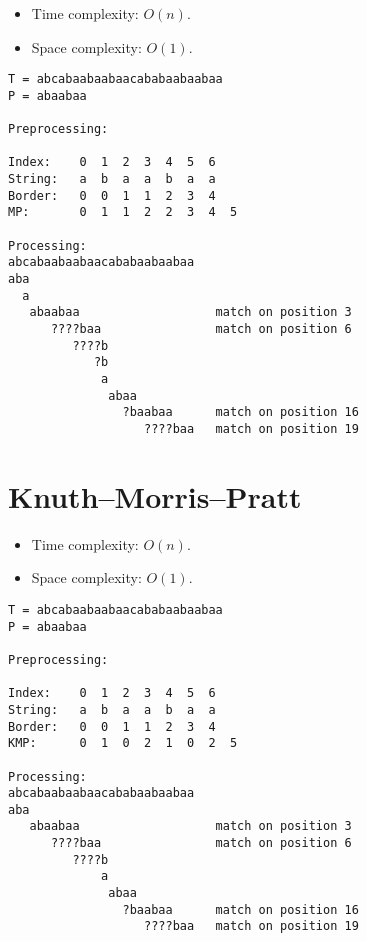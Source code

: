 \begin{itemize}
\item Time complexity: $O(n)$.
\item Space complexity: $O(1)$.
\end{itemize}

\begin{verbatim}
T = abcabaabaabaacababaabaabaa
P = abaabaa

Preprocessing:

Index:    0  1  2  3  4  5  6
String:   a  b  a  a  b  a  a 
Border:   0  0  1  1  2  3  4 
MP:       0  1  1  2  2  3  4  5 

Processing:
abcabaabaabaacababaabaabaa
aba
  a
   abaabaa                   match on position 3
      ????baa                match on position 6
         ????b
            ?b
             a
              abaa
                ?baabaa      match on position 16
                   ????baa   match on position 19
\end{verbatim}


\section{Knuth--Morris--Pratt}

\begin{itemize}
\item Time complexity: $O(n)$.
\item Space complexity: $O(1)$.
\end{itemize}

\begin{verbatim}
T = abcabaabaabaacababaabaabaa
P = abaabaa

Preprocessing:

Index:    0  1  2  3  4  5  6
String:   a  b  a  a  b  a  a
Border:   0  0  1  1  2  3  4
KMP:      0  1  0  2  1  0  2  5

Processing:
abcabaabaabaacababaabaabaa
aba
   abaabaa                   match on position 3
      ????baa                match on position 6
         ????b
             a
              abaa
                ?baabaa      match on position 16
                   ????baa   match on position 19
\end{verbatim}

